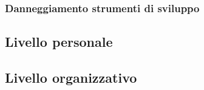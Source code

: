 		\subsubsection{Danneggiamento strumenti di sviluppo}
		
		
	\subsection{Livello personale}
	
	\subsection{Livello organizzativo}
